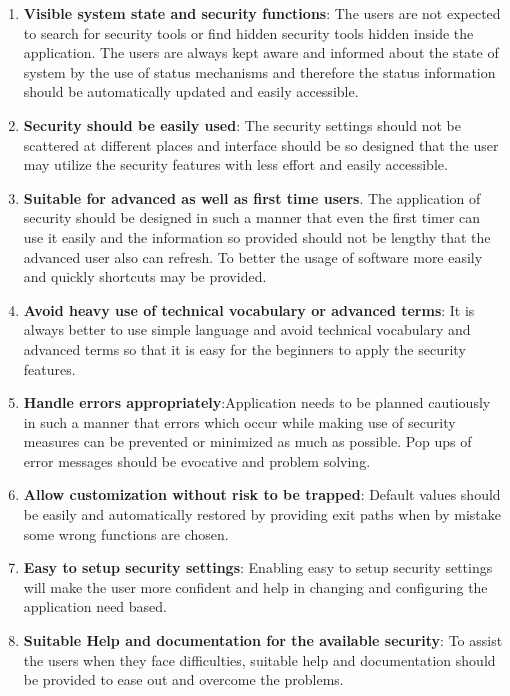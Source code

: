  \begin{enumerate}
 	
 	\item \textbf{Visible system state and security functions}: The users are not expected to search for security tools or find hidden security tools hidden inside the application.  The users are always kept aware and informed about the state of system by the use of status mechanisms and therefore the status information should be automatically updated and easily accessible.
 	
 	\item \textbf{Security should be easily used}: The security settings should not be scattered at different places and interface should be so designed that the user may utilize the security features with less effort and easily accessible. 
 	
 	\item \textbf{Suitable for advanced as well as first time users}. The application of security should be designed in such a manner that even the first timer can use it easily and the information so provided should not be lengthy that the advanced user also can refresh.  To better the usage of software more easily and quickly shortcuts may be provided.
 	
 	
 	\item \textbf{Avoid heavy use of technical vocabulary or advanced terms}: It is always better to use simple language and avoid technical vocabulary and advanced terms so that it is easy for the beginners to apply the security features. 
 	
 	\item \textbf{Handle errors appropriately}:Application needs to be planned cautiously in such a manner that errors which occur while making use of security measures can be prevented or minimized as much as possible.  Pop ups of error messages should be evocative and problem solving.
 	
 	
 	\item \textbf{Allow customization without risk to be trapped}: Default values should be easily and automatically restored by providing exit paths when by mistake some wrong functions are chosen.
 	
 	
 	\item \textbf{Easy to setup security settings}: Enabling easy to setup security settings will make the user more confident and help in changing and configuring the application need based.
 	
 	
 	\item \textbf{Suitable Help and documentation for the available security}: To assist the users when they face difficulties, suitable help and documentation should be provided to ease out and overcome the problems.
 	

\end{enumerate}
